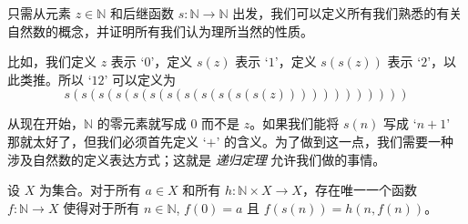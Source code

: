 只需从元素 $z \in \mathbb{N}$ 和后继函数 $s : \mathbb{N} \to \mathbb{N}$ 出发，我们可以定义所有我们熟悉的有关自然数的概念，并证明所有我们认为理所当然的性质。

比如，我们定义 $z$ 表示 `$0$'，定义 $s(z)$ 表示 `$1$'，定义 $s(s(z))$ 表示 `$2$'，以此类推。所以 `$12$' 可以定义为
\[ s(s(s(s(s(s(s(s(s(s(s(s(z)))))))))))) \]

从现在开始，$\mathbb{N}$ 的零元素就写成 $0$ 而不是 $z$。如果我们能将 $s(n)$ 写成 `$n+1$' 那就太好了，但我们必须首先定义 `$+$' 的含义。为了做到这一点，我们需要一种涉及自然数的定义表达方式；这就是 \textit{递归定理} 允许我们做的事情。

\begin{theorem}[递归定理]
\label{thmRecursion}
设 $X$ 为集合。对于所有 $a \in X$ 和所有 $h : \mathbb{N} \times X \to X$，存在唯一一个函数 $f : \mathbb{N} \to X$ 使得对于所有 $n \in \mathbb{N}$, $f(0) = a$ 且 $f(s(n)) = h(n, f(n))$。
\end{theorem}


